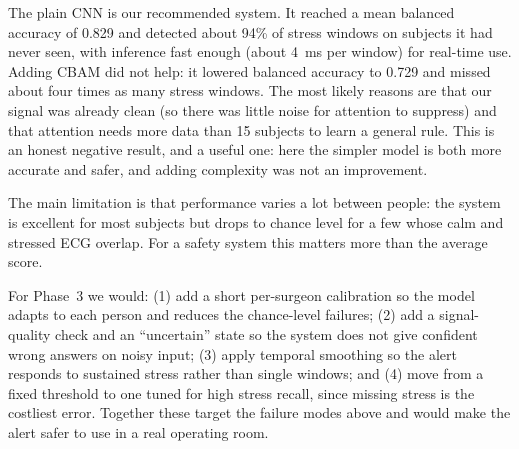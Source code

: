 \documentclass[conference]{IEEEtran}
\begin{document}
The plain CNN is our recommended system. It reached a mean balanced accuracy of
0.829 and detected about 94\% of stress windows on subjects it had never seen,
with inference fast enough (about 4~ms per window) for real-time use. Adding CBAM
did not help: it lowered balanced accuracy to 0.729 and missed about four times
as many stress windows. The most likely reasons are that our signal was already
clean (so there was little noise for attention to suppress) and that attention
needs more data than 15 subjects to learn a general rule. This is an honest
negative result, and a useful one: here the simpler model is both more accurate
and safer, and adding complexity was not an improvement.

The main limitation is that performance varies a lot between people: the system
is excellent for most subjects but drops to chance level for a few whose calm and
stressed ECG overlap. For a safety system this matters more than the average
score.

For Phase~3 we would: (1) add a short per-surgeon calibration so the model adapts
to each person and reduces the chance-level failures; (2) add a signal-quality
check and an ``uncertain'' state so the system does not give confident wrong
answers on noisy input; (3) apply temporal smoothing so the alert responds to
sustained stress rather than single windows; and (4) move from a fixed threshold
to one tuned for high stress recall, since missing stress is the costliest error.
Together these target the failure modes above and would make the alert safer to
use in a real operating room.
\end{document}
